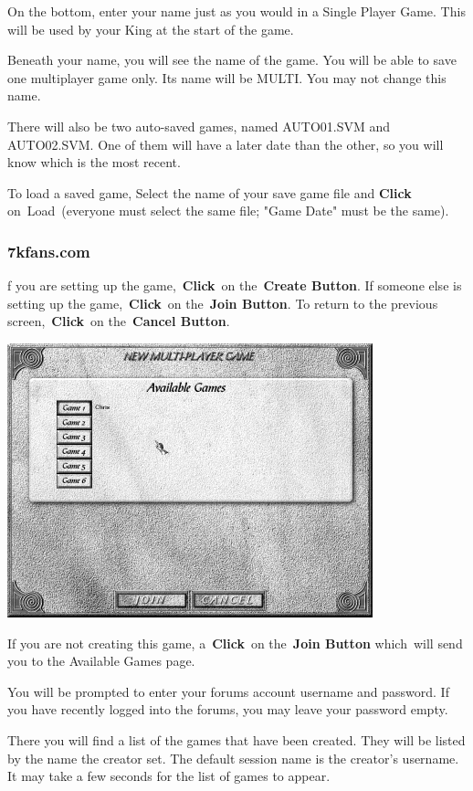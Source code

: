 On the bottom, enter your name just as you would in a Single Player Game. This will be used by your King at the start of the game.

Beneath your name, you will see the name of the game. You will be able to save one multiplayer game only. Its name will be MULTI. You may not change this name.

There will also be two auto-saved games, named AUTO01.SVM and AUTO02.SVM. One of them will have a later date than the other, so you will know which is the most recent.

To load a saved game, Select the name of your save game file and \textbf{Click} on Load (everyone must select the same file; "Game Date" must be the same).

\subsubsection{7kfans.com}

f you are setting up the game, \textbf{Click} on the \textbf{Create Button}. If someone else is setting up the game, \textbf{Click} on the \textbf{Join Button}. To return to the previous screen, \textbf{Click} on the \textbf{Cancel Button}.

\begin{center}
	\includegraphics[width=0.7\linewidth]{Imultiplayer2}
\end{center}

If you are not creating this game, a \textbf{Click} on the \textbf{Join Button} which will send you to the Available Games page.

You will be prompted to enter your forums account username and password. If you have recently logged into the forums, you may leave your password empty.

There you will find a list of the games that have been created. They will be listed by the name the creator set. The default session name is the creator’s username. It may take a few seconds for the list of games to appear.

